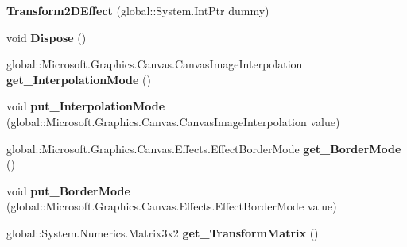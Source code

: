 \begin{DoxyCompactItemize}
{\bfseries Transform2\+D\+Effect} (global\+::\+System.\+Int\+Ptr dummy)
\item 
\mbox{\label{class_microsoft_1_1_graphics_1_1_canvas_1_1_effects_1_1_transform2_d_effect_ac0a088ca93fab0d1da165143fccc2bf1}} 
void {\bfseries Dispose} ()
\item 
\mbox{\label{class_microsoft_1_1_graphics_1_1_canvas_1_1_effects_1_1_transform2_d_effect_a3e8f7b5eac9642f7b67f3051339ad6e0}} 
global\+::\+Microsoft.\+Graphics.\+Canvas.\+Canvas\+Image\+Interpolation {\bfseries get\+\_\+\+Interpolation\+Mode} ()
\item 
\mbox{\label{class_microsoft_1_1_graphics_1_1_canvas_1_1_effects_1_1_transform2_d_effect_a7f4454ee99f14f9f2a19f8f9a7faf9f5}} 
void {\bfseries put\+\_\+\+Interpolation\+Mode} (global\+::\+Microsoft.\+Graphics.\+Canvas.\+Canvas\+Image\+Interpolation value)
\item 
\mbox{\label{class_microsoft_1_1_graphics_1_1_canvas_1_1_effects_1_1_transform2_d_effect_aba647ac3b58290db44c3c98ca8c19749}} 
global\+::\+Microsoft.\+Graphics.\+Canvas.\+Effects.\+Effect\+Border\+Mode {\bfseries get\+\_\+\+Border\+Mode} ()
\item 
\mbox{\label{class_microsoft_1_1_graphics_1_1_canvas_1_1_effects_1_1_transform2_d_effect_a3c44e6817302d293e5cd76726375a5e1}} 
void {\bfseries put\+\_\+\+Border\+Mode} (global\+::\+Microsoft.\+Graphics.\+Canvas.\+Effects.\+Effect\+Border\+Mode value)
\item 
\mbox{\label{class_microsoft_1_1_graphics_1_1_canvas_1_1_effects_1_1_transform2_d_effect_ac3153a849025ced8b89361d97104772b}} 
global\+::\+System.\+Numerics.\+Matrix3x2 {\bfseries get\+\_\+\+Transform\+Matrix} ()
\item 
\mbox{\label{class_microsoft_1_1_graphics_1_1_canvas_1_1_effects_1_1_transform2_d_effect_ab2dc992da27919ab922f3015532abe68}} 

\end{DoxyCompactItemize}
